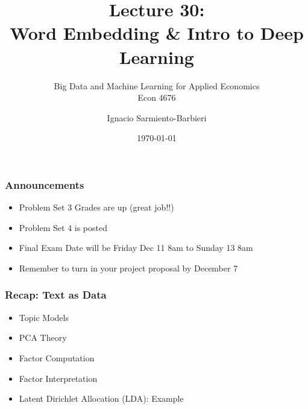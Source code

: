 \documentclass[
  shownotes,
  xcolor={svgnames},
  hyperref={colorlinks,citecolor=DarkBlue,linkcolor=DarkRed,urlcolor=DarkBlue}
  , aspectratio=169]{beamer}
\begin{document}
\title[Lecture 30]{Lecture 30: \\ Word  Embedding \& Intro to Deep Learning }
\subtitle{Big Data and Machine Learning for Applied Economics \\ Econ 4676}
\date{\today}

\author[Sarmiento-Barbieri]{Ignacio Sarmiento-Barbieri}


\begin{frame}[noframenumbering]
\maketitle
\end{frame}





\begin{frame}
\frametitle{Announcements }


\begin{itemize} 
    \item  Problem Set 3 Grades are up (great job!!)
    \bigskip
    \item  Problem Set 4 is posted
    \bigskip
    \item  Final Exam Date will be Friday Dec 11 8am to Sunday 13 8am
    \bigskip
    \item  Remember to turn in your project proposal by December 7
    
\end{itemize}
\end{frame}

\begin{frame}
\frametitle{Recap: Text as Data}

\begin{itemize} 
  
\item Topic Models
\bigskip
\item PCA Theory
\bigskip
\item Factor Computation 
\bigskip
\item Factor Interpretation
\bigskip
\item Latent Dirichlet Allocation (LDA): Example

\end{itemize}
  
\end{frame}
\end{document}
